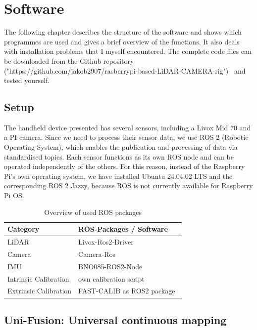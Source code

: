 \documentclass[english, bachelor, utf8]{base/thesis_telematics}
\begin{document}
\chapter{Software}

The following chapter describes the structure of the software and shows which
programmes are used and gives a brief overview of the functions.
It also deals with installation problems that I myself
encountered.
The complete code files can be downloaded from the Github repository ("https://github.com/jakob2907/rasberrypi-based-LiDAR-CAMERA-rig")~\cite{github_handheld}
and tested yourself.

\section{Setup}
The handheld device presented has several sensors, including a Livox Mid 70 and
a PI camera. Since we need to process their sensor data, we use ROS 2 (Robotic Operating System), which
enables the publication and processing of data via standardised topics.
Each sensor functions as its own ROS node and can be operated independently of the others.
For this reason, instead of the Raspberry Pi's own operating system, we have installed Ubuntu 24.04.02 LTS and the
corresponding ROS 2 Jazzy, because ROS is not currently available for Raspberry Pi OS.~\cite{ros2_jazzy_releases} 

\begin{table}[h!]
\centering
\begin{tabular}{|l|l|}
\hline
\textbf{Category} & \textbf{ROS-Packages / Software} \\
\hline
LiDAR & Livox-Ros2-Driver~\cite{LivoxROS2Driver} \\
\hline
Camera & Camera-Ros~\cite{CameraROS} \\
\hline
IMU & BNO085-ROS2-Node~\cite{BNO085ROS2Node} \\
\hline
Intrinsic Calibration & own calibration script~\cite{github_handheld}\\
\hline
Extrinsic Calibration & FAST-CALIB as ROS2 package~\cite{FASTCalibROS2}\\
\hline
\end{tabular}
\caption{Overview of used ROS packages}
\label{tab:ros_packages}
\end{table}

\section{Uni-Fusion: Universal continuous mapping}
\end{document}
